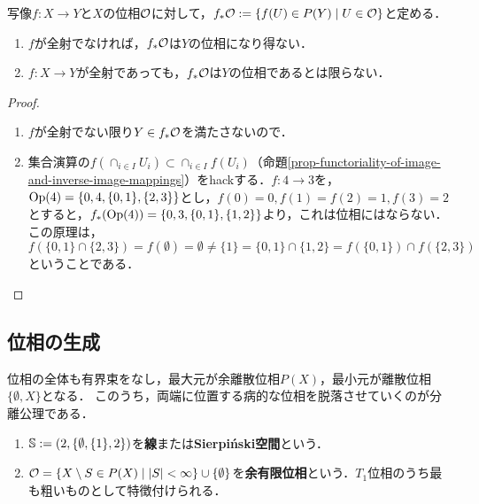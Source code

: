 \documentclass[uplatex,dvipdfmx]{jsreport}
\begin{document}
\begin{proposition}
    写像$f:X\to Y$と$X$の位相$\mathcal{O}$に対して，$f_*\mathcal{O}:=\{f(U)\in P(Y)\mid U\in\mathcal{O}\}$と定める．
    \begin{enumerate}
        \item $f$が全射でなければ，$f_*\mathcal{O}$は$Y$の位相になり得ない．
        \item $f:X\to Y$が全射であっても，$f_*\mathcal{O}$は$Y$の位相であるとは限らない．
    \end{enumerate}
\end{proposition}
\begin{proof}\mbox{}
    \begin{enumerate}
        \item $f$が全射でない限り$Y\in f_*\mathcal{O}$を満たさないので．
        \item 集合演算の$f(\cap_{i\in I}U_i)\subset \cap_{i\in I}f(U_i)$（命題\ref{prop-functoriality-of-image-and-inverse-image-mappings}）をhackする．$f:4\to 3$を，$\mathrm{Op}(4)=\{0,4,\{0,1\},\{2,3\}\}$とし，$f(0)=0,f(1)=f(2)=1,f(3)=2$とすると，$f_*(\mathrm{Op}(4))=\{0,3,\{0,1\},\{1,2\}\}$より，これは位相にはならない．
        この原理は，$f(\{0,1\}\cap\{2,3\})=f(\emptyset)=\emptyset\ne\{1\}=\{0,1\}\cap\{1,2\}=f(\{0,1\})\cap f(\{2,3\})$ということである．
    \end{enumerate}
\end{proof}

\subsection{位相の生成}

\begin{tcolorbox}[colframe=ForestGreen, colback=ForestGreen!10!white,breakable,colbacktitle=ForestGreen!40!white,coltitle=black,fonttitle=\bfseries\sffamily,
    title=]
    位相の全体も有界束をなし，最大元が余離散位相$P(X)$，最小元が離散位相$\{\emptyset,X\}$となる．
    このうち，両端に位置する病的な位相を脱落させていくのが分離公理である．
\end{tcolorbox}

\begin{example}\mbox{}
    \begin{enumerate}
        \item $\mathbb{S}:=(2,\{\emptyset,\{1\},2\})$を\textbf{線}または\textbf{Sierpi\'{n}ski空間}という．
        \item $\mathcal{O}=\left\{X\setminus S\in P(X)\mid \lvert S\rvert<\infty\right\}\cup\{\emptyset\}$を\textbf{余有限位相}という．$T_1$位相のうち最も粗いものとして特徴付けられる．
    \end{enumerate}
\end{example}
\end{document}
